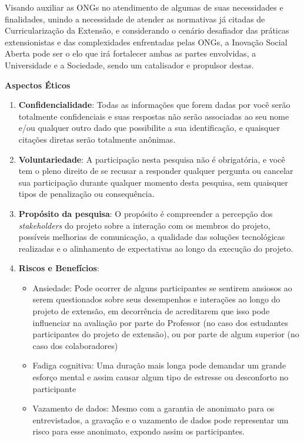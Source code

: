 Visando auxiliar as ONGs no atendimento de algumas de suas necessidades e finalidades, unindo a necessidade de atender as normativas já citadas de Curricularização da Extensão, e considerando o cenário desafiador das práticas extensionistas e das complexidades enfrentadas pelas ONGs, a Inovação Social Aberta pode ser o elo que irá fortalecer ambas as partes envolvidas, a Universidade e a Sociedade, sendo um catalisador e propulsor destas.

\textbf{Aspectos Éticos}

\begin{enumerate}
    \item \textbf{Confidencialidade}: Todas as informações que forem dadas por você serão totalmente confidenciais e suas respostas não serão associadas ao seu nome e/ou qualquer outro dado que possibilite a sua identificação, e quaisquer citações diretas serão totalmente anônimas.
    \item \textbf{Voluntariedade}: A participação nesta pesquisa não é obrigatória, e você tem o pleno direito de se recusar a responder qualquer pergunta ou cancelar sua participação durante qualquer momento desta pesquisa, sem quaisquer tipos de penalização ou consequência.
    \item \textbf{Propósito da pesquisa}: O propósito é compreender a percepção dos \textit{stakeholders} do projeto sobre a interação com os membros do projeto, possíveis melhorias de comunicação, a qualidade das soluções tecnológicas realizadas e o alinhamento de expectativas ao longo da execução do projeto.
    \item \textbf{Riscos e Benefícios}:
    \begin{itemize}
        \item Ansiedade: Pode ocorrer de alguns participantes se sentirem ansiosos ao serem questionados sobre seus desempenhos e interações ao longo do projeto de extensão, em decorrência de acreditarem que isso pode influenciar na avaliação por parte do Professor (no caso dos estudantes participantes do projeto de extensão), ou por parte de algum superior  (no caso dos colaboradores)
        \item Fadiga cognitiva: Uma duração mais longa pode demandar um grande esforço mental e assim causar algum tipo de estresse ou desconforto no participante
        \item Vazamento de dados: Mesmo com a garantia de anonimato para os entrevistados, a gravação e o vazamento de dados pode representar um risco para esse anonimato, expondo assim os participantes.

\end{itemize}
\end{enumerate}
